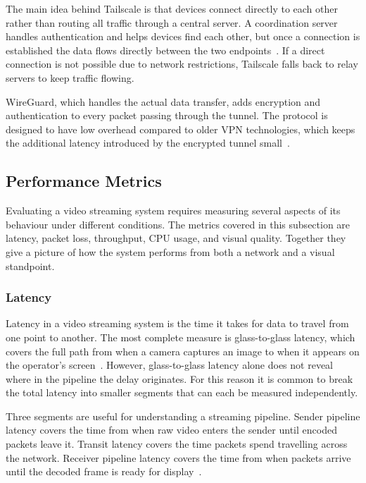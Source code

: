 The main idea behind Tailscale is that devices connect directly to each other rather than routing all traffic through a central server. A coordination server handles authentication and helps devices find each other, but once a connection is established the data flows directly between the two endpoints~\cite{tailscale_what}. If a direct connection is not possible due to network restrictions, Tailscale falls back to relay servers to keep traffic flowing.
 
WireGuard, which handles the actual data transfer, adds encryption and authentication to every packet passing through the tunnel. The protocol is designed to have low overhead compared to older VPN technologies, which keeps the additional latency introduced by the encrypted tunnel small~\cite{donenfeld2017wireguard}.

\vspace{5mm}
\subsection{Performance Metrics}\label{subsec:metrics}
Evaluating a video streaming system requires measuring several aspects of its behaviour under different conditions. The metrics covered in this subsection are latency, packet loss, throughput, CPU usage, and visual quality. Together they give a picture of how the system performs from both a network and a visual standpoint.

\subsubsection{Latency}\label{subsec:latency-metric}
Latency in a video streaming system is the time it takes for data to travel from one point to another. The most complete measure is glass-to-glass latency, which covers the full path from when a camera captures an image to when it appears on the operator's screen~\cite{kaknjo2018}. However, glass-to-glass latency alone does not reveal where in the pipeline the delay originates. For this reason it is common to break the total latency into smaller segments that can each be measured independently.
 
Three segments are useful for understanding a streaming pipeline. Sender pipeline latency covers the time from when raw video enters the sender until encoded packets leave it. Transit latency covers the time packets spend travelling across the network. Receiver pipeline latency covers the time from when packets arrive until the decoded frame is ready for display~\cite{kaknjo2018}.
 
